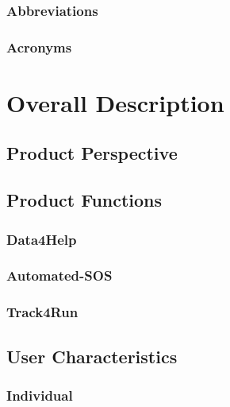 \documentclass[a4paper]{article}
\begin{document}
            \subsubsection{Abbreviations}
            
            \subsubsection{Acronyms}
            \begin{acronym}
            \end{acronym}
            
\newpage
\section{Overall Description}

    \subsection{Product Perspective}
    
    \subsection{Product Functions}
    
        \subsubsection{Data4Help}
        
        \subsubsection{Automated-SOS}
        
        \subsubsection{Track4Run}
    
    \subsection{User Characteristics}
    
        \subsubsection{Individual}
        
\end{document}

